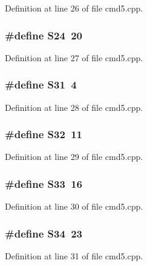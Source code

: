 Definition at line 26 of file cmd5.\+cpp.

\subsubsection[{S24}]{\setlength{\rightskip}{0pt plus 5cm}\#define S24~20}\label{cmd5_8cpp_a0c09eb77d30a0d5f9154914147b86c20}


Definition at line 27 of file cmd5.\+cpp.

\subsubsection[{S31}]{\setlength{\rightskip}{0pt plus 5cm}\#define S31~4}\label{cmd5_8cpp_aef26590f8a880ee6f4a158168defcd89}


Definition at line 28 of file cmd5.\+cpp.

\subsubsection[{S32}]{\setlength{\rightskip}{0pt plus 5cm}\#define S32~11}\label{cmd5_8cpp_a1d512424dd8a91e0a5bcc98563f33914}


Definition at line 29 of file cmd5.\+cpp.

\subsubsection[{S33}]{\setlength{\rightskip}{0pt plus 5cm}\#define S33~16}\label{cmd5_8cpp_a1c854214533f6220e859b0063196abb3}


Definition at line 30 of file cmd5.\+cpp.

\subsubsection[{S34}]{\setlength{\rightskip}{0pt plus 5cm}\#define S34~23}\label{cmd5_8cpp_af6472be1d535970afee8e5266a74aa07}


Definition at line 31 of file cmd5.\+cpp.

